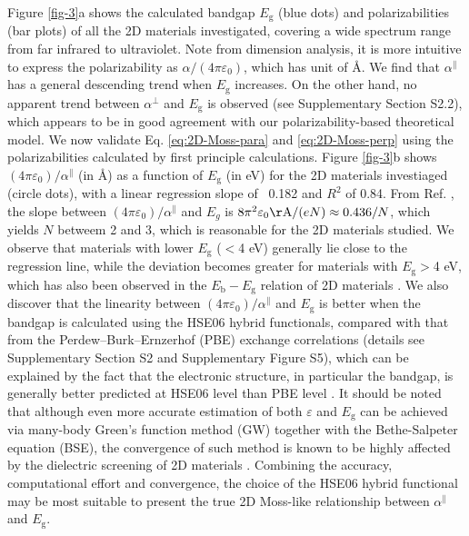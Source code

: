 \documentclass[journal=ancac3,manuscript=article,email=true,hyperref=true,keywords=false]{achemso}
\begin{document}
Figure \ref{fig-3}a shows the calculated bandgap $E_{\mathrm{g}}$
(blue dots) and polarizabilities (bar plots) of all the 2D materials
investigated, covering a wide spectrum range from far infrared to
ultraviolet. Note from dimension analysis, it is more intuitive to
express the polarizability as $\alpha/(4 \pi \varepsilon_{0})$, which
has unit of \AA. We find that $\alpha^{\parallel}$ has a general
descending trend when $E_{\mathrm{g}}$ increases. On the other hand,
no apparent trend between $\alpha^{\perp}$ and $E_{\mathrm{g}}$ is
observed (see Supplementary Section S2.2), which appears to be in good
agreement with our polarizability-based theoretical model. We now
validate Eq. \ref{eq:2D-Moss-para} and \ref{eq:2D-Moss-perp} using the
polarizabilities calculated by first principle calculations. Figure
\ref{fig-3}b shows $(4 \pi \varepsilon_{0})/\alpha^{\parallel}$ (in
\AA{}) as a function of $E_{\mathrm{g}}$ (in eV) for the 2D materials
investiaged (circle dots), with a linear regression slope of ~0.182
and $R^{2}$ of 0.84. From Ref. , the slope
between $(4 \pi \varepsilon_{0})/\alpha^{\parallel}$ and $E_{g}$ is
$8\pi^{2}\varepsilon_{0} \mathrm{\AA}/(eN) \approx 0.436/N$, which
yields $N$ betweem 2 and 3, which is reasonable for the 2D materials
studied. We observe that materials with lower $E_{\mathrm{g}}$ ($<$4
eV) generally lie close to the regression line, while the deviation
becomes greater for materials with $E_{\mathrm{g}}>$4 eV, which has
also been observed in the $E_{\mathrm{b}}-E_{\mathrm{g}}$ relation of
2D materials \cite{Olsen_2016_hydrogen,Jiang_2017_Eg_Eb}. We also
discover that the linearity between
$(4 \pi \varepsilon_{0})/\alpha^{\parallel}$ and $E_{\mathrm{g}}$ is
better when the bandgap is calculated using the HSE06 hybrid
functionals, compared with that from the Perdew--Burk--Ernzerhof (PBE)
exchange correlations (details see Supplementary Section S2 and
Supplementary Figure S5), which can be explained by the fact that the
electronic structure, in particular the bandgap, is generally better
predicted at HSE06 level than PBE level \cite{Heyd_2005}. It should be
noted that although even more accurate estimation of both
$\varepsilon$ and $E_{\mathrm{g}}$ can be achieved via many-body
Green’s function method (GW) together with the Bethe-Salpeter equation
(BSE), the convergence of such method is known to be highly affected
by the dielectric screening of 2D materials
\cite{Hueser_2013_2Dvs3D}. Combining the accuracy, computational
effort and convergence, the choice of the HSE06 hybrid functional may
be most suitable to present the true 2D Moss-like relationship between
$\alpha^{\parallel}$ and $E_{\mathrm{g}}$. 
\end{document}
